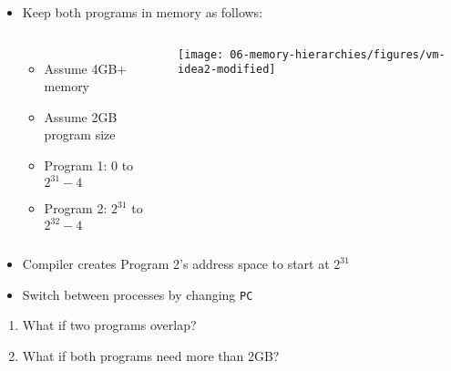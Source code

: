 \begin{frame}[fragile]
\begin{itemize}
\item Keep both programs in memory as follows:\\
\begin{columns}[c] %


\begin{itemize}
    \item Assume 4GB+ memory
    \item Assume 2GB program size
    \item Program 1: 0 to $2^{31}-4$
    \item Program 2: $2^{31}$ to $2^{32}-4$
\end{itemize}

	{\texttt{[image: 06-memory-hierarchies/figures/vm-idea2-modified]}}
\end{columns}

    \item Compiler creates Program 2's address space to start at $2^{31}$

    \item Switch between processes by changing \texttt{PC}
\end{itemize}
\begin{tcolorbox}[enhanced,attach boxed title to top center={yshift=-3mm,yshifttext=-1mm},
  colback=blue!5!white,colframe=blue!75!black,colbacktitle=blue!80!black,
  title=Think About It,fonttitle=\bfseries,
  boxed title style={size=small,colframe=red!50!black} ]
\begin{enumerate}
 \item What if two programs overlap?
    \item What if both programs need more than 2GB?
\end{enumerate}
  \end{tcolorbox}
    


\end{frame}
